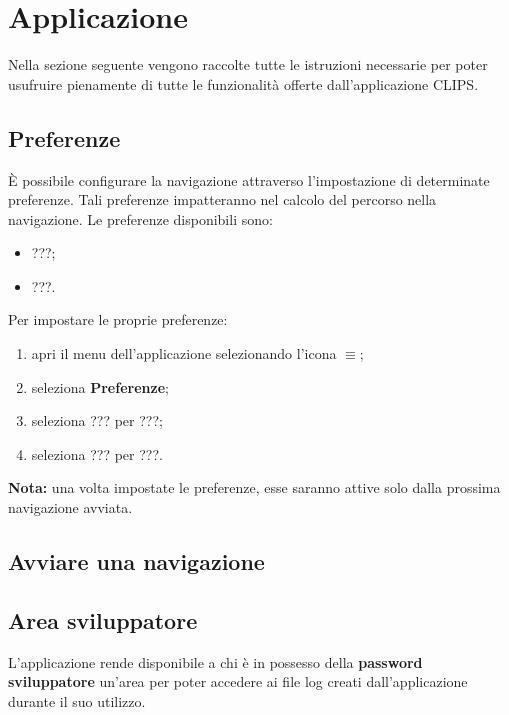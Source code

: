 \documentclass[../ClipsManualeUtente.tex]{subfiles}
\begin{document}
\section{Applicazione}
	Nella sezione seguente vengono raccolte tutte le istruzioni necessarie per poter usufruire pienamente di tutte le funzionalità offerte dall'applicazione CLIPS.
	
	\newpage
	\subsection{Preferenze}
		È possibile configurare la navigazione attraverso l'impostazione di determinate preferenze. Tali preferenze impatteranno nel calcolo del percorso nella navigazione.
		Le preferenze disponibili sono:
			\begin{itemize}
				\item ???;
				\item ???.
			\end{itemize}
		
		Per impostare le proprie preferenze:
		\begin{enumerate}
			\item apri il menu dell'applicazione selezionando l'icona $\equiv$;
			\item seleziona \textbf{Preferenze};
			\item seleziona ??? per ???;
			\item seleziona ??? per ???.
		\end{enumerate}

	\begin{framed} 
	\textbf{Nota:} una volta impostate le preferenze, esse saranno attive solo dalla prossima navigazione avviata.
	\end{framed}
	
	
	\newpage
	\subsection{Avviare una navigazione}
		
	\newpage
	\subsection{Area sviluppatore}
		L'applicazione rende disponibile a chi è in possesso della \textbf{password sviluppatore} un'area per poter accedere ai file log creati dall'applicazione durante il suo utilizzo.
		
\end{document}
